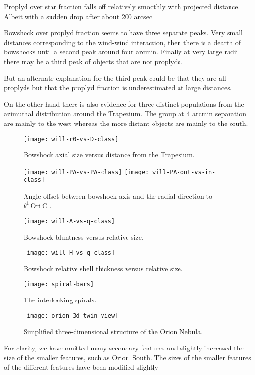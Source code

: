 \documentclass[iop, apj]{emulateapj}
\newcommand\thC{\ensuremath{\theta^1\,\mathrm{Ori~C}}}
\begin{document}
Proplyd over star fraction falls off relatively smoothly with projected distance.  Albeit with a sudden drop after about 200 arcsec.


Bowshock over proplyd fraction seems to have three separate peaks.   Very small distances corresponding to the wind-wind interaction, then there is a dearth of bowshocks until a second peak around four arcmin.  Finally at very large radii there may be a third peak of objects that are not proplyds.

But an alternate explanation for the third peak could be that they are all proplyds but that the proplyd fraction is underestimated at large distances.

On the other hand there is also evidence for three distinct populations from the azimuthal distribution around the Trapezium.  The group at 4 arcmin separation are mainly to the west whereas the more distant objects are mainly to the south.


\begin{figure}
  \centering
  \texttt{[image: will-r0-vs-D-class]}
  \caption{Bowshock axial size versus distance from the Trapezium.}
  \label{fig:size-v-distance}
\end{figure}
\begin{figure}
  \centering
  \texttt{[image: will-PA-vs-PA-class]}
  \texttt{[image: will-PA-out-vs-in-class]}
  \caption{Angle offset between bowshock axis and the radial direction to \thC{} .}
  \label{fig:PA-v-PA}
\end{figure}
\begin{figure}
  \centering
  \texttt{[image: will-A-vs-q-class]}
  \caption{Bowshock bluntness versus relative size.}
  \label{fig:A-v-q}
\end{figure}
\begin{figure}
  \centering
  \texttt{[image: will-H-vs-q-class]}
  \caption{Bowshock relative shell thickness versus relative size.}
  \label{fig:PA-v-PA}
\end{figure}

\begin{figure}
  \centering
  \texttt{[image: spiral-bars]}
  \caption{The interlocking spirals.}
  \label{fig:spiral-bars}
\end{figure}

\begin{figure*}
  \centering
  \texttt{[image: orion-3d-twin-view]}
  \caption{Simplified three-dimensional structure of the Orion Nebula.}
  \label{fig:3d-twin}
\end{figure*}

For clarity, we have omitted many secondary features and slightly increased the
size of the smaller features, such as Orion~South. 
The sizes of the smaller features  of the different features have been modified slightly


\end{document}
